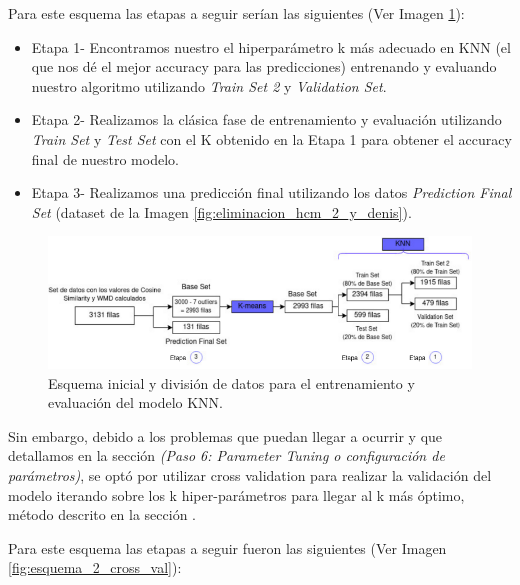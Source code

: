 \documentclass[12pt,a4paper]{article}
\begin{document}
\begin{sloppypar}
Para este esquema las etapas a seguir serían las siguientes (Ver Imagen \ref{fig:esquema_1_validacion}):

\begin{itemize}
\item Etapa 1- Encontramos nuestro el hiperparámetro k más adecuado en KNN (el que nos dé el mejor accuracy para las predicciones) entrenando y evaluando nuestro algoritmo utilizando \textit{Train Set 2} y \textit{Validation Set}.

\item Etapa 2- Realizamos la clásica fase de entrenamiento y evaluación utilizando \textit{Train Set} y \textit{Test Set} con el K obtenido en la Etapa 1 para obtener el accuracy final de nuestro modelo.

\item Etapa 3- Realizamos una predicción final utilizando los datos \textit{Prediction Final Set} (dataset de la Imagen \ref{fig:eliminacion_hcm_2_y_denis}). 
\end{itemize}

\begin{figure}[H]   
\centering
\includegraphics[width=1\textwidth]{images/implementacion_5/esquema_1_validacion.png}
\captionsetup{justification=centering,margin=2cm}
\caption{Esquema inicial y división de datos para el entrenamiento y evaluación del modelo KNN.}
\label{fig:esquema_1_validacion}
\end{figure}

Sin embargo, debido a los problemas que puedan llegar a ocurrir y que detallamos en la sección \textit{ (Paso 6: Parameter Tuning o configuración de parámetros)}, se optó por utilizar cross validation para realizar la validación del modelo iterando sobre los k hiper-parámetros para llegar al k más óptimo, método descrito en la sección \textit{}.

\cleardoublepage

Para este esquema las etapas a seguir fueron las siguientes (Ver Imagen \ref{fig:esquema_2_cross_val}):


\end{sloppypar}
\end{document}

